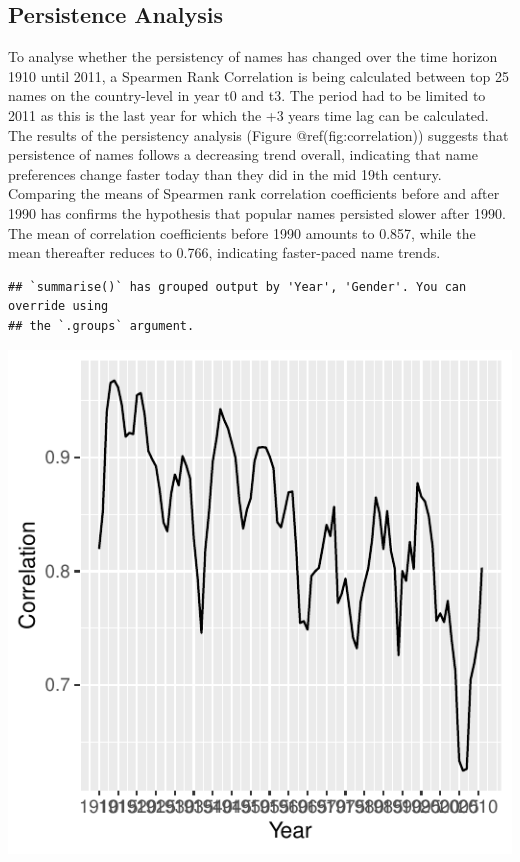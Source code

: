 \documentclass[11pt,preprint]{elsarticle}
\let\origfigure\figure
\let\endorigfigure\endfigure
\renewenvironment{figure}[1][2] {
    \expandafter\origfigure\expandafter[H]
} {
    \endorigfigure
}
\numberwithin{equation}{section}
\numberwithin{figure}{section}
\numberwithin{table}{section}
\begin{document}
\subsection{Persistence Analysis}\label{persistence-analysis}

To analyse whether the persistency of names has changed over the time
horizon 1910 until 2011, a Spearmen Rank Correlation is being calculated
between top 25 names on the country-level in year t0 and t3. The period
had to be limited to 2011 as this is the last year for which the +3
years time lag can be calculated. The results of the persistency
analysis (Figure @ref(fig:correlation)) suggests that persistence of
names follows a decreasing trend overall, indicating that name
preferences change faster today than they did in the mid 19th century.
Comparing the means of Spearmen rank correlation coefficients before and
after 1990 has confirms the hypothesis that popular names persisted
slower after 1990. The mean of correlation coefficients before 1990
amounts to 0.857, while the mean thereafter reduces to 0.766, indicating
faster-paced name trends.

\begin{verbatim}
## `summarise()` has grouped output by 'Year', 'Gender'. You can override using
## the `.groups` argument.
\end{verbatim}

\begin{figure}[H]

{\centering \includegraphics{Task_1_files/figure-latex/fig-correlation-1} 

}

\caption{Correlation Trend Over Time (1910–2011)}\label{fig:fig-correlation}
\end{figure}
\end{document}
